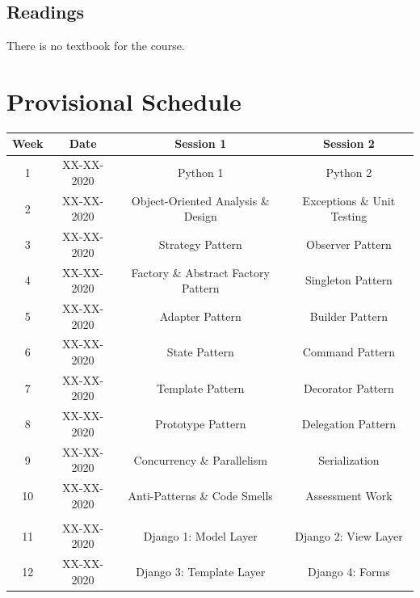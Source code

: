 \documentclass{article}
\begin{document}
\subsection*{Readings}
There is no textbook for the course.

\section*{Provisional Schedule}

\renewcommand{\arraystretch}{1.5}
\begin{tabular}{|c|c|c|c|}
	\hline
	\textbf{Week} & \textbf{Date} & \textbf{Session 1}                  & \textbf{Session 2}              \\ \hline
	1             & XX-XX-2020    & Python 1                            & Python 2                        \\ \hline					
	2             & XX-XX-2020    & Object-Oriented Analysis \& Design  & Exceptions \& Unit Testing      \\ \hline
	3             & XX-XX-2020    & Strategy Pattern                    & Observer Pattern                \\ \hline
	4             & XX-XX-2020    & Factory \& Abstract Factory Pattern & Singleton Pattern               \\ \hline
	5             & XX-XX-2020    & Adapter Pattern                     & Builder Pattern                 \\ \hline
	6             & XX-XX-2020    & State Pattern                       & Command Pattern                 \\ \hline
	7             & XX-XX-2020    & Template Pattern                    & Decorator Pattern               \\ \hline
	8             & XX-XX-2020    & Prototype Pattern                   & Delegation Pattern              \\ \hline
	9             & XX-XX-2020    & Concurrency \& Parallelism          & Serialization                   \\ \hline
	10            & XX-XX-2020    & Anti-Patterns \& Code Smells        & Assessment Work                 \\ \hline
	\rowcolor{yellow} \multicolumn{4}{|c|}{Mid Term Break}                                                \\ \hline
	11            & XX-XX-2020    & Django 1: Model Layer               & Django 2: View Layer            \\ \hline
	12            & XX-XX-2020    & Django 3: Template Layer            & Django 4: Forms                 \\ \hline

\end{tabular}
\end{document}
